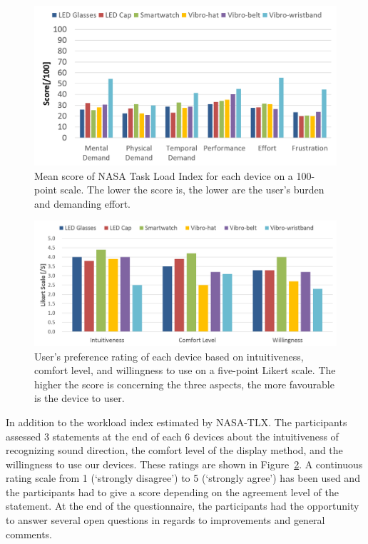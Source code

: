 \documentclass{sigchi}
\begin{document}
\begin{figure}[!t]
\centering
\includegraphics[width=\columnwidth]{stage2_TLX}
\caption{Mean score of NASA Task Load Index for each device on a 100-point scale. The lower the score is, the lower are the user's burden and demanding effort.}
\label{fig:nasa_tlx}
\end{figure}

\begin{figure}[!t]
\centering
\includegraphics[width=\columnwidth]{stage2_Likert}
\caption{User's preference rating of each device based on intuitiveness, comfort level, and willingness to use on a five-point Likert scale. The higher the score is concerning the three aspects, the more favourable is the device to user.}
\label{fig:likert_scale}
\end{figure}

In addition to the workload index estimated by NASA-TLX. The participants assessed 3 statements at the end of each 6 devices about the intuitiveness of recognizing sound direction, the comfort level of the display method, and the willingness to use our devices. These ratings are shown in Figure~\ref{fig:likert_scale}.
A continuous rating scale from 1 (\textquoteleft strongly disagree\textquoteright) to 5 (\textquoteleft strongly agree\textquoteright) has been used and the participants had to give a score depending on the agreement level of the statement. At the end of the questionnaire, the participants had the opportunity to answer several open questions in regards to improvements and general comments.
\end{document}
